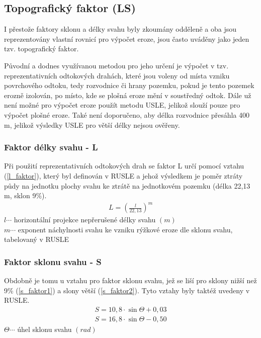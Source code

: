 \subsection{Topografický faktor (LS)}
I přestože faktory sklonu a délky svahu byly zkoumány odděleně a oba jsou reprezentovány vlastní rovnicí pro výpočet eroze, jsou často uváděny jako jeden tzv. topografický faktor.\cite{usle1978}

Původní a dodnes využívanou metodou pro jeho určení je výpočet v tzv. reprezentativních odtokových drahách, které jsou voleny od místa vzniku povrchového odtoku, tedy rozvodnice či hrany pozemku, pokud je tento pozemek erozně izolován, po místo, kde se plošná eroze mění v soustředný odtok. Dále už není možné pro výpočet eroze použít metodu USLE, jelikož slouží pouze pro výpočet plošné eroze. Také není doporučeno, aby délka rozvodnice přesáhla 400 m, jelikož výsledky USLE pro větší délky nejsou ověřeny.\cite{janecek2012}

\subsubsection{Faktor délky svahu - L} 
Při použití reprezentativních odtokových drah se faktor L určí pomocí vztahu (\ref{l_faktor}), který byl definován v RUSLE\cite{rusle1997} a jehož výsledkem je poměr ztráty půdy na jednotku plochy svahu ke ztrátě na jednotkovém pozemku (délka 22,13 m, sklon 9\%).\cite{janecek2012}
\begin{align}
   \label{l_faktor} L=\left( \frac{l}{22,13} \right)^m
\end{align}
\hspace*{2cm}$l \cdots$ horizontální projekce nepřerušené délky svahu $\left( m \right)$  \\
\hspace*{2cm}$m \cdots$ exponent náchylnosti svahu ke vzniku rýžkové eroze dle sklonu svahu, tabelovaný v RUSLE\cite{rusle1997} \\ 
\subsubsection{Faktor sklonu svahu - S} 
Obdobně je tomu u vztahu pro faktor sklonu svahu, jež se liší pro sklony nižší než 9\% (\ref{s_faktor1}) a slony větší (\ref{s_faktor2}). Tyto vztahy byly taktéž uvedeny v RUSLE\cite{rusle1997}.
\begin{align}
   \label{s_faktor1} S=10,8\cdot\sin\Theta + 0,03
\end{align}
\vspace{-40pt}
\begin{align}
   \label{s_faktor2} S=16,8\cdot\sin\Theta - 0,50
\end{align}
\hspace*{2cm}$\Theta \cdots$ úhel sklonu svahu $\left( rad \right)$


